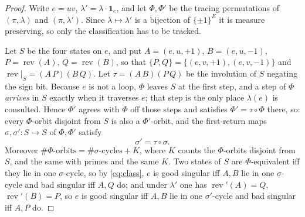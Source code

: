 \documentclass[11pt]{amsart}
\begin{document}
\begin{proof}
Write $e=uv$, $\lambda'=\lambda\cdot\mathbf{1}_{e}$, and let $\Phi,\Phi'$ be
the tracing permutations of $(\pi,\lambda)$ and $(\pi,\lambda')$. Since
$\lambda\mapsto\lambda'$ is a bijection of $\{\pm1\}^{E}$ it is measure
preserving, so only the classification has to be tracked.

Let $S$ be the four states on $e$, and put $A=(e,u,+1)$, $B=(e,u,-1)$,
$P=\operatorname{rev}(A)$, $Q=\operatorname{rev}(B)$, so that
$\{P,Q\}=\{(e,v,+1),(e,v,-1)\}$ and $\operatorname{rev}|_{S}=(A\,P)(B\,Q)$.
Let $\tau=(A\,B)(P\,Q)$ be the involution of $S$ negating the sign bit.
Because $e$ is not a loop, $\Phi$ leaves $S$ at the first step, and a step of
$\Phi$ \emph{arrives} in $S$ exactly when it traverses $e$; that step is the
only place $\lambda(e)$ is consulted. Hence $\Phi'$ agrees with $\Phi$ off
those steps and satisfies $\Phi'=\tau\circ\Phi$ there, so: every $\Phi$-orbit
disjoint from $S$ is also a $\Phi'$-orbit, and the first-return maps
$\sigma,\sigma':S\to S$ of $\Phi,\Phi'$ satisfy
\begin{equation}\label{eq:return}
 \sigma'=\tau\circ\sigma .
\end{equation}
Moreover $\#\Phi\text{-orbits}=\#\sigma\text{-cycles}+K$, where $K$ counts the
$\Phi$-orbits disjoint from $S$, and the same with primes and the same $K$.
Two states of $S$ are $\Phi$-equivalent iff they lie in one $\sigma$-cycle, so
by \eqref{eq:class}, $e$ is good singular iff $A,B$ lie in one $\sigma$-cycle
and bad singular iff $A,Q$ do; and under $\lambda'$ one has
$\operatorname{rev}'(A)=Q$, $\operatorname{rev}'(B)=P$, so $e$ is good
singular iff $A,B$ lie in one $\sigma'$-cycle and bad singular iff $A,P$ do.


\end{proof}
\end{document}
